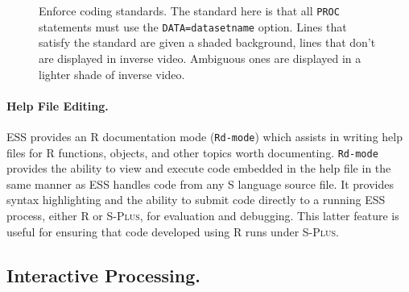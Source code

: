 \documentclass{article}
\newcommand*{\Splus}{\textsc{S-Plus}}
\newcommand{\stexttt}[1]{{\small\texttt{#1}}}
\begin{document}
\begin{figure}[tbp]
  \caption{Enforce coding standards.  The standard here is
    that all \stexttt{PROC} statements must use the
    \stexttt{DATA=datasetname} option.  Lines that satisfy the
    standard are given a shaded background, lines that don't are
    displayed in inverse video.  Ambiguous ones are displayed in a
    lighter shade of inverse video.}
  \label{f.hilock}
\end{figure}


\paragraph{Help File Editing.}
ESS provides an R documentation mode (\stexttt{Rd-mode}) which assists
in writing help files for R functions, objects, and other topics worth
documenting.  \stexttt{Rd-mode} provides the ability to view and
execute code embedded in the help file in the same manner as ESS
handles code from any S language source file.  It provides syntax
highlighting and the ability to submit code directly to a running ESS
process, either R or \Splus, for evaluation and debugging.  This
latter feature is useful for ensuring that code developed using R runs
under \Splus.




\subsection{Interactive Processing.}
\label{sec:interactive}
\end{document}
